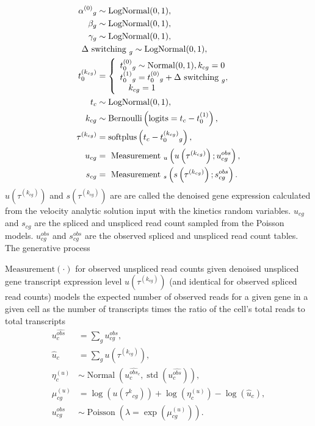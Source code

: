\documentclass[
  sn-mathphys-num,
  lineno,
  twocolumn]{sn-jnl}
\begin{document}
\begin{align}
\alpha^{(0)}{ }_g &\sim \operatorname{LogNormal}(0,1), \\
\beta_g &\sim \operatorname{LogNormal}(0,1), \\
\gamma_g &\sim \operatorname{LogNormal}(0,1), \\
&\hskip -18pt \Delta \text { switching }_g \sim \operatorname{LogNormal}(0,1), \\
t_0^{\left(k_{c g}\right)} &= \left\{
  \begin{array}{l}
    t_0^{(0)}{ }_g \sim \operatorname{Normal}(0,1), k_{c g}=0 \\
    t_0^{(1)}{ }_g=t_0^{(0)}{ }_g+\Delta \text { switching }_g, \\
    \quad k_{c g}=1
  \end{array}\right. \\
t_c &\sim \operatorname{LogNormal}(0,1), \\
k_{c g} &\sim \text{Bernoulli} \left( \text{logits}= t_c-t_0^{(1)} \right), \\
\tau^{\left(k_{c g}\right)} 
  &= \operatorname{softplus}\left(t_c-t_0^{\left(k_{c g}\right)}{ }_g\right), \\
u_{c g} 
 &= \text { Measurement }_u \left( u\left(\tau^{\left(k_{c g}\right)}\right) ; 
                                   u_{c g}^{obs}\right), \\
s_{c g} 
  &= \text { Measurement }_s \left( s\left(\tau^{(k_{c g})}\right) ; 
                                    s_{c g}^{obs}\right).
\end{align} \(u\left(\tau^{\left(k_{c g}\right)}\right)\) and
\(s\left(\tau^{(k_{c g})}\right)\) are are called the denoised gene
expression calculated from the velocity analytic solution input with the
kinetics random variables. \(u_{cg}\) and \(s_{cg}\) are the spliced and
unspliced read count sampled from the Poisson models. \(u_{cg}^{obs}\)
and \(s_{cg}^{obs}\) are the observed spliced and unspliced read count
tables. The generative process

\(\text{Measurement}(\cdot)\) for observed unspliced read counts given
denoised unspliced gene transcript expression level
\(u\left(\tau^{(k_{cg})}\right)\) (and identical for observed spliced
read counts) models the expected number of observed reads for a given
gene in a given cell as the number of transcripts times the ratio of the
cell's total reads to total transcripts \begin{align}
u_c^{\hat{obs}} &= \sum_g u_{c g}^{obs}, \\
\hat{u}_c &= \sum_g u\left( \tau^{(k_{c g})}\right), \\
\eta_c^{(u)} &\sim \operatorname{Normal}\left(
    u_c^{\hat{obs}_c}, 
    \operatorname{std} \left(u_c^{\hat{obs}}\right)
  \right), \\
\mu_{c g}^{(u)} &= \log \left(u\left(\tau^k{ }_{c g}\right)\right)
  +\log \left(\eta_c^{(u)}\right)-\log \left(\hat{u}_c\right), \\
u_{c g}^{obs} &\sim 
  \operatorname{Poisson}\left(\lambda=\exp \left(\mu_{c g}^{(u)}\right)\right).
\end{align}
\end{document}
